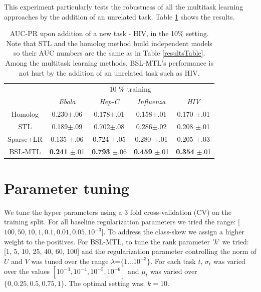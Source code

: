 \documentclass[a4paper,11pt]{article}
\begin{document}
This experiment particularly tests the robustness of all the multitask learning approaches by the addition of an unrelated task.
Table \ref{hivresults} shows the results. 

\begin{table}[h]\caption{AUC-PR upon addition of a new task - HIV, in the 10\% setting. Note that STL and the homolog method build independent models so their AUC numbers are the same as in Table \ref{resultsTable}. Among the multitask learning methods, BSL-MTL's performance is not hurt by the addition of an unrelated task such as HIV.}
\label{hivresults}
\begin{small}
\begin{center}
\begin{tabular}{c|cccc}
\toprule
& \multicolumn{4}{c}{10 \% training } \\
& \textit{Ebola} & \textit{Hep-C} & \textit{Influenza} & \textit{HIV} \\ \midrule
Homolog & 0.230$\pm$.06 & 0.178$\pm$.01 & 0.158$\pm$.01 & 0.170 $\pm$.01 \\
STL  & 0.189$\pm$.09 & 0.702$\pm$.08 & 0.286$\pm$.02  & 0.208 $\pm$.01 \\ 
Sparse+LR & 0.135 $\pm$.06 & 0.724 $\pm$.05 & 0.280 $\pm$.01 & 0.205 $\pm$.03  \\ 
BSL-MTL & \textbf{0.241} $\pm$.01 & \textbf{0.793} $\pm$.06 & \textbf{0.459} $\pm$.01 & \textbf{0.354} $\pm$.01  \\ \bottomrule
\end{tabular}
\end{center}
\end{small}
\end{table}




\section{Parameter tuning}
We tune the hyper parameters using a 3 fold cross-validation (CV) on the training split. For all baseline regularization parameters %
we tried the range: [$100, 50, 10, 1, 0.1, 0.01, 0.05, 10^{-3}$]. To address the class-skew we 
assign a higher weight to the positives. For BSL-MTL, to tune the rank parameter '$k$' we tried: [1, 5, 10, 25, 40, 60, 100] and the regularization parameter controlling the norm of $U$ and $V$ was tuned over the range $\lambda$=$\{1 ... 10^{-3}\}$. For each task $t$, $\sigma_t$ was varied over the values $[10^{-3}, 10^{-4}, 10^{-5}, 10^{-6}]$ and
$\mu_t$ was varied over $\{0, 0.25, 0.5, 0.75, 1\}$.
The optimal setting was:  $k=10$. %
\end{document}
